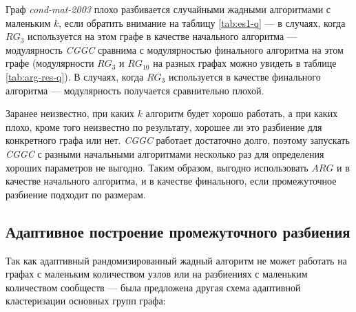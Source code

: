 Граф \emph{cond-mat-2003} плохо разбивается случайными жадными алгоритмами с маленьким $k$, если обратить внимание на таблицу \ref{tab:es1-q} --- в случаях, когда $RG_3$ используется на этом графе в качестве начального алгоритма --- модулярность \emph{CGGC} сравнима с модулярностью финального алгоритма на этом графе (модулярности $RG_3$ и $RG_{10}$ на разных графах можно увидеть в таблице \ref{tab:arg-res-q}). В случаях, когда $RG_3$ используется в качестве финального алгоритма --- модулярность получается сравнительно плохой.

Заранее неизвестно, при каких $k$ алгоритм будет хорошо работать, а при каких плохо, кроме того неизвестно по результату, хорошее ли это разбиение для конкретного графа или нет. \emph{CGGC} работает достаточно долго, поэтому запускать \emph{CGGC} с разными начальными алгоритмами несколько раз для определения хороших параметров не выгодно. Таким образом, выгодно использовать $ARG$ и в качестве начального алгоритма, и в качестве финального, если промежуточное разбиение подходит по размерам.



\subsection{Адаптивное построение промежуточного разбиения}
\label{subsec:es-adaptive}

Так как адаптивный рандомизированный жадный алгоритм не может работать на графах с маленьким количеством узлов или на разбиениях с маленьким количеством сообществ --- была предложена другая схема адаптивной кластеризации основных групп графа:

